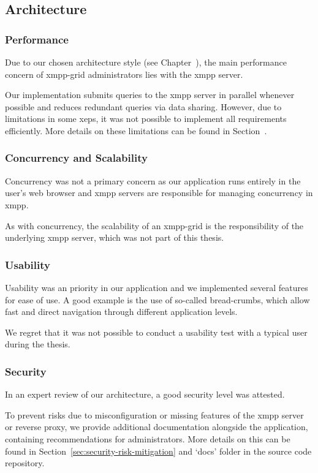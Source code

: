 \subsection{Architecture}

\subsubsection{Performance}
Due to our chosen architecture style (see Chapter~),
the main performance concern of \gls{xmpp-grid} administrators lies with the \gls{xmpp} server.

Our implementation submits queries to the \gls{xmpp} server in parallel whenever possible and reduces redundant queries via data sharing.
However, due to limitations in some \glspl{xep}, it was not possible to implement all requirements efficiently.
More details on these limitations can be found in Section~.

\subsubsection{Concurrency and Scalability}
Concurrency was not a primary concern as our application runs entirely in the user's web browser and \gls{xmpp} servers are responsible for managing concurrency in \gls{xmpp}.

As with concurrency, the scalability of an \gls{xmpp-grid} is the responsibility of the underlying \gls{xmpp} server, which was not part of this thesis.


\subsubsection{Usability}
Usability was an priority in our application and we implemented several features for ease of use.
A good example is the use of so-called bread-crumbs, which allow fast and direct navigation through different application levels.

We regret that it was not possible to conduct a usability test with a typical user during the thesis.

\subsubsection{Security}
In an expert review of our architecture, a good security level was attested.

To prevent risks due to misconfiguration or missing features of the \gls{xmpp} server or reverse proxy, we provide additional documentation alongside the application, containing recommendations for administrators. More details on this can be found in Section~\ref{sec:security-risk-mitigation} and `docs' folder in the source code repository.

